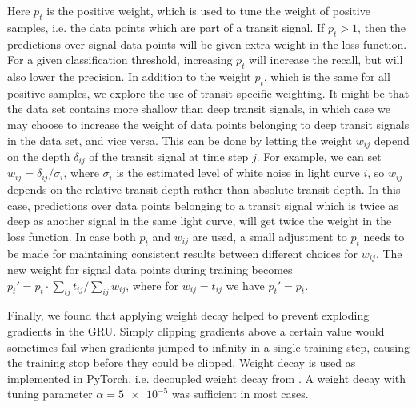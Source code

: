 Here $p_t$ is the positive weight, which is used to tune the weight of positive samples, i.e. the data points which are part of a transit signal. If $p_t > 1$, then the predictions over signal data points will be given extra weight in the loss function. For a given classification threshold, increasing $p_t$ will increase the recall, but will also lower the precision. In addition to the weight $p_t$, which is the same for all positive samples, we explore the use of transit-specific weighting. It might be that the data set contains more shallow than deep transit signals, in which case we may choose to increase the weight of data points belonging to deep transit signals in the data set, and vice versa. This can be done by letting the weight $w_{ij}$ depend on the depth $\delta_{ij}$ of the transit signal at time step $j$. For example, we can set $w_{ij} = \delta_{ij} / \sigma_{i}$, where $\sigma_i$ is the estimated level of white noise in light curve $i$, so $w_{ij}$ depends on the relative transit depth rather than absolute transit depth. In this case, predictions over data points belonging to a transit signal which is twice as deep as another signal in the same light curve, will get twice the weight in the loss function. In case both $p_t$ and $w_{ij}$ are used, a small adjustment to $p_t$ needs to be made for maintaining consistent results between different choices for $w_{ij}$. The new weight for signal data points during training becomes  $p_t' = p_t \cdot \sum_{ij} t_{ij} / \sum_{ij} w_{ij}$, where for $w_{ij} = t_{ij}$ we have $p_t' = p_t$.

Finally, we found that applying weight decay helped to prevent exploding gradients in the GRU. Simply clipping gradients above a certain value would sometimes fail when gradients jumped to infinity in a single training step, causing the training stop before they could be clipped. Weight decay is used as implemented in PyTorch, i.e. decoupled weight decay from \cite{loshchilov2017decoupled}. A weight decay with tuning parameter $\alpha=\num{5e-5}$ was sufficient in most cases.

